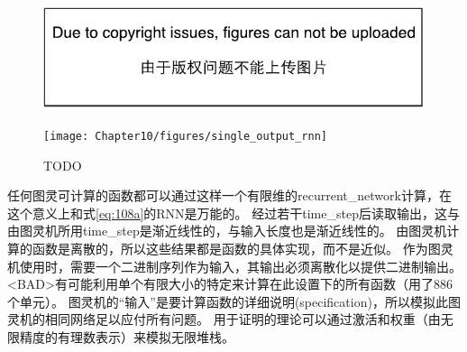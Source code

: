 \begin{figure}[!htb]
\ifOpenSource
\centerline{\includegraphics{figure.pdf}}
\else
\centerline{\texttt{[image: Chapter10/figures/single\_output\_rnn]}}
\fi
\caption{TODO}
\label{fig:chap10_single_output_rnn}
\end{figure}

任何图灵可计算的函数都可以通过这样一个有限维的\gls{recurrent_network}计算，在这个意义上和式\eqref{eq:108a}的\gls{RNN}是万能的。
经过若干\gls{time_step}后读取输出，这与由图灵机所用\gls{time_step}是渐近线性的，与输入长度也是渐近线性的\citep{Siegelmann+Sontag-1991,Siegelmann-1995,Siegelmann+Sontag-1995,Hyotyniemi-1996}。
由图灵机计算的函数是离散的，所以这些结果都是函数的具体实现，而不是近似。
作为图灵机使用时，需要一个二进制序列作为输入，其输出必须离散化以提供二进制输出。
<BAD>有可能利用单个有限大小的特定来计算在此设置下的所有函数（\cite{Siegelmann+Sontag-1995}用了886个单元）。
图灵机的``输入''是要计算函数的详细说明(specification)，所以模拟此图灵机的相同网络足以应付所有问题。
用于证明的理论可以通过激活和权重（由无限精度的有理数表示）来模拟无限堆栈。


